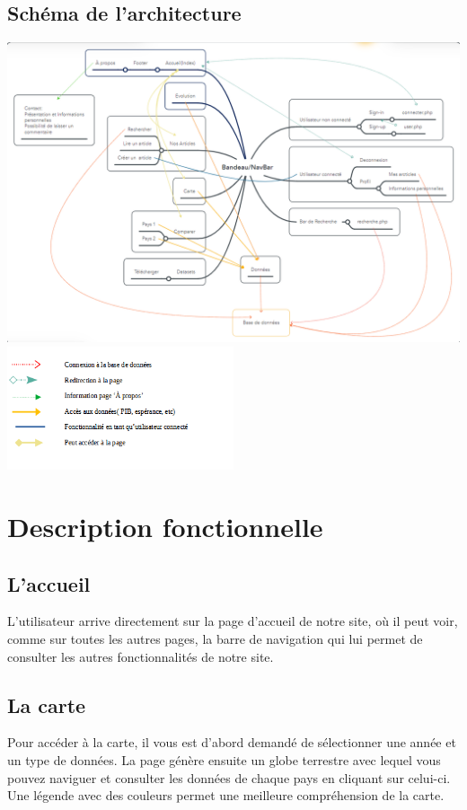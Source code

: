\documentclass[12pt,a4paper]{report}
\begin{document}
\section{Schéma de l'architecture}
    \begin{center}
        \includegraphics[width=1\textwidth]{images/architecture.png}
        \includegraphics[width=0.5\textwidth]{images/legende_architecture.png}
    \end{center}

\chapter{Description fonctionnelle}
\vspace{-2cm}
\section{L'accueil}
L'utilisateur arrive directement sur la page d'accueil de notre site, où il peut voir, comme sur toutes les autres pages, la barre de navigation qui lui permet de consulter les autres fonctionnalités de notre site.

\section{La carte}
Pour accéder à la carte, il vous est d'abord demandé de sélectionner une année et un type de données. La page génère ensuite un globe terrestre avec lequel vous pouvez naviguer et consulter les données de chaque pays en cliquant sur celui-ci. Une légende avec des couleurs permet une meilleure compréhension de la carte.
\end{document}
